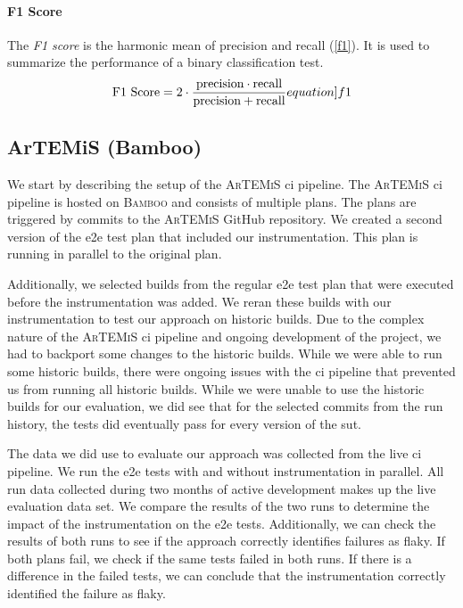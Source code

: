 \paragraph{F1 Score} The \emph{F1 score} is the harmonic mean of precision and recall (\ref{f1}).
It is used to summarize the performance of a binary classification test.
\begin{equation}
	\text{F1 Score} = 2 \cdot \frac{\text{precision} \cdot \text{recall}}{\text{precision} + \text{recall}}
	\label[equation]{f1}
\end{equation}

\subsection{ArTEMiS (Bamboo)}
We start by describing the setup of the \textsc{ArTEMiS} \ac{ci} pipeline.
The \textsc{ArTEMiS} \ac{ci} pipeline is hosted on \textsc{Bamboo} \autocite{atlassian_bamboo_nodate} and consists of multiple plans.
The plans are triggered by commits to the \textsc{ArTEMiS} GitHub repository.
We created a second version of the \ac{e2e} test plan that included our instrumentation.
This plan is running in parallel to the original plan.

Additionally, we selected builds from the regular \ac{e2e} test plan that were executed before the instrumentation was added.
We reran these builds with our instrumentation to test our approach on historic builds.
Due to the complex nature of the \textsc{ArTEMiS} \ac{ci} pipeline and ongoing development of the project, we had to backport some changes to the historic builds.
While we were able to run some historic builds, there were ongoing issues with the \ac{ci} pipeline that prevented us from running all historic builds.
While we were unable to use the historic builds for our evaluation, we did see that for the selected commits from the run history, the tests did eventually pass for every version of the \ac{sut}.

The data we did use to evaluate our approach was collected from the live \ac{ci} pipeline.
We run the \ac{e2e} tests with and without instrumentation in parallel.
All run data collected during two months of active development makes up the live evaluation data set.
We compare the results of the two runs to determine the impact of the instrumentation on the \ac{e2e} tests.
Additionally, we can check the results of both runs to see if the approach correctly identifies failures as flaky.
If both plans fail, we check if the same tests failed in both runs.
If there is a difference in the failed tests, we can conclude that the instrumentation correctly identified the failure as flaky.

